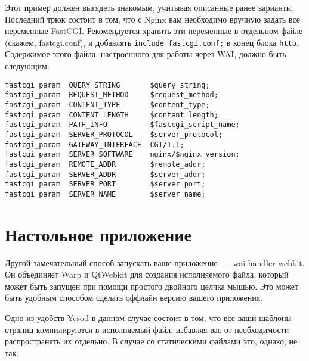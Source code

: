 Этот пример должен выгядеть знакомым, учитывая описанные ранее варианты. Последний трюк состоит в том, что с Nginx вам необходимо вручную задать все переменные FastCGI. Рекомендуется хранить эти переменные в отдельном файле (скажем, fastcgi.conf), и добавлять \lstinline{include fastcgi.conf;} в конец блока \lstinline{http}. Содержимое этого файла, настроенного для работы через WAI, должно быть следующим:

\begin{lstlisting}
fastcgi_param  QUERY_STRING       $query_string;
fastcgi_param  REQUEST_METHOD     $request_method;
fastcgi_param  CONTENT_TYPE       $content_type;
fastcgi_param  CONTENT_LENGTH     $content_length;
fastcgi_param  PATH_INFO          $fastcgi_script_name;
fastcgi_param  SERVER_PROTOCOL    $server_protocol;
fastcgi_param  GATEWAY_INTERFACE  CGI/1.1;
fastcgi_param  SERVER_SOFTWARE    nginx/$nginx_version;
fastcgi_param  REMOTE_ADDR        $remote_addr;
fastcgi_param  SERVER_ADDR        $server_addr;
fastcgi_param  SERVER_PORT        $server_port;
fastcgi_param  SERVER_NAME        $server_name;
\end{lstlisting}
%

\section{Настольное приложение}
%

Другой замечательный способ запускать ваше приложение~--- wai-handler-webkit. Он объединяет Warp и QtWebkit для создания исполняемого файла, который может быть запущен при помощи простого двойного целчка мышью. Это может быть удобным способом сделать оффлайн версию вашего приложения.
%

Одно из удобств Yesod в данном случае состоит в том, что все ваши шаблоны страниц компилируются в исполняемый файл, избавляя вас от необходимости распространять их отдельно. В случае со статическими файлами это, однако, не так.
%

